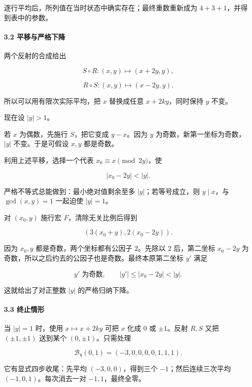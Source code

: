 {逐行平均后，所列值在当时状态中确实存在；最终重数重新成为} \(4+3+1\){，并得到表中的参数。}

\paragraph*{\texorpdfstring{{3.2} {平移与严格下降}}{3.2 平移与严格下降}}\label{C34-h228}

{两个反射的合成给出}

\[
S\circ R:(x,y)\longmapsto(x+2y,y),
\]

\[
R\circ S:(x,y)\longmapsto(x-2y,y).
\]

{所以可以用有限次实际平均，把} \(x\) {替换成任意} \(x+2ky\){，同时保持} \(y\) {不变。}

{现在设} \(|y|>1\){。}

{若} \(x\) {为偶数，先施行} \(S\){，把它变成} \(y-x\){。因为} \(y\) {为奇数，新第一坐标为奇数，}\(|y|\) {不变。于是可假设} \(x,y\) {都是奇数。}

{利用上述平移，选择一个代表} \(x_0\equiv x\pmod{2y}\){，使}

\[
|x_0-2y|<|y|.
\]

{严格不等式总能做到：最小绝对值剩余至多} \(|y|\){；若等号成立，则} \(y\mid x\){，与} \(\gcd(x,y)=1\) {一起迫使} \(|y|=1\){。}

{对} \((x_0,y)\) {施行宏} \(F\){，清除无关比例后得到}

\[
(3(x_0+y),2(x_0-2y)).
\]

{因为} \(x_0,y\) {都是奇数，两个坐标都有公因子} \(2\){。先除以} \(2\) {后，第二坐标} \(x_0-2y\) {为奇数，所以之后约去的公因子也是奇数。最终本原第二坐标} \(y'\) {满足}

\[
y'\text{ 为奇数},\qquad |y'|\le |x_0-2y|<|y|.
\]

{这就给出了对正整数} \(|y|\) {的严格归纳下降。}

\paragraph*{\texorpdfstring{{3.3} {终止情形}}{3.3 终止情形}}\label{C34-h229}

{当} \(|y|=1\) {时，使用} \(x\mapsto x+2ky\) {可把} \(x\) {化成} \(0\) {或} \(\pm1\){。反射} \(R,S\) {又把} \((\pm1,\pm1)\) {送到某个} \((0,\pm1)\){。只需处理}

\[
\mathcal B_8(0,1)=(-3,0,0,0,0,1,1,1).
\]

{它有显式四步收尾：先平均} \((-3,0,0)\){，得到三个} \(-1\){；然后连续三次平均} \((-1,0,1)\){。每次消去一对} \(-1,1\){，最终全零。}

